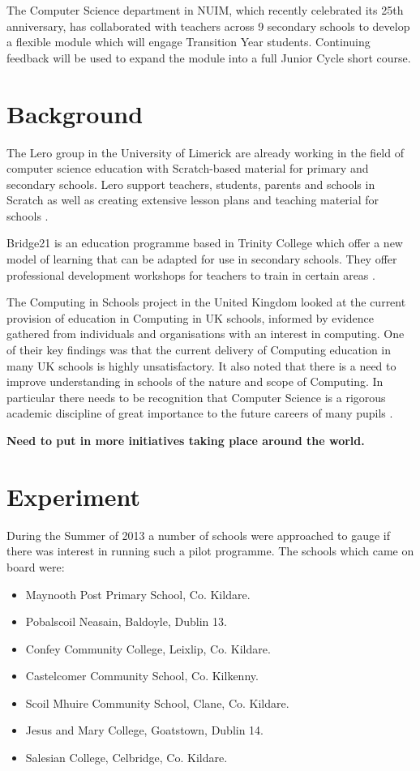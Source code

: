 \documentclass{article}
\begin{document}
The Computer Science department in NUIM, which recently celebrated its 25th anniversary, has collaborated with teachers across 9 secondary schools to develop a flexible module which will engage Transition Year students. Continuing feedback will be used to expand the module into a full Junior Cycle short course. 

\section{Background}
The Lero group in the University of Limerick are already working in the field of computer science education with Scratch-based material for primary and secondary schools. Lero support teachers, students, parents and schools in Scratch as well as creating extensive lesson plans and teaching material for schools \cite{scratch2013}.


Bridge21 is an education programme based in Trinity College which offer a new model of learning that can be adapted for use in secondary schools. They offer professional development workshops for teachers to train in certain areas \cite{bridge21}.

The Computing in Schools project in the United Kingdom looked at the current provision of education in Computing in UK schools, informed by evidence gathered from individuals and organisations with an interest in computing. One of their key findings was that the current delivery of Computing education in many UK schools is highly unsatisfactory. It also noted that there is a need to improve understanding in schools of the nature and scope of Computing. In particular there needs to be recognition that Computer Science is a rigorous academic discipline of great importance to the future careers of many pupils \cite{compSchools}.

\textbf{Need to put in more initiatives taking place around the world.}\\

\section{Experiment}
During the Summer of 2013 a number of schools were approached to gauge if there was interest in running such a pilot programme. The schools which came on board were:
\begin{itemize}
  \item Maynooth Post Primary School, Co. Kildare.
  \item Pobalscoil Neasain, Baldoyle, Dublin 13.
  \item Confey Community College, Leixlip, Co. Kildare.
  \item Castelcomer Community School, Co. Kilkenny.
  \item Scoil Mhuire Community School, Clane, Co. Kildare.
  \item Jesus and Mary College, Goatstown, Dublin 14.
  \item Salesian College, Celbridge, Co. Kildare.
\end{itemize}
\end{document}
